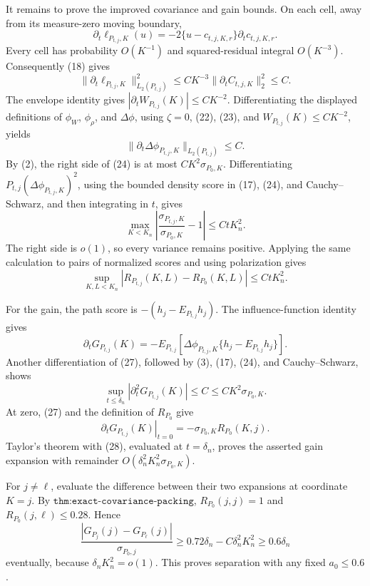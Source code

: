 It remains to prove the improved covariance and gain bounds.  On each cell, away from its measure-zero moving boundary,
\[
 \partial_t\ell_{P_{t,j},K}(u)=-2\{u-c_{t,j,K,r}\}\partial_tc_{t,j,K,r}.
\]
Every cell has probability \(O(K^{-1})\) and squared-residual integral \(O(K^{-3})\).  Consequently (18) gives
\[
 \|\partial_t\ell_{P_{t,j},K}\|_{L_2(P_{t,j})}^2
 \leq CK^{-3}\|\partial_tC_{t,j,K}\|_2^2\leq C.                                      \tag{23}
\]
The envelope identity gives \(|\partial_tW_{P_{t,j}}(K)|\leq CK^{-2}\).  Differentiating the displayed definitions of \(\phi_W\), \(\phi_\rho\), and \(\Delta\phi\), using \(\zeta=0\), (22), (23), and \(W_{P_{t,j}}(K)\leq CK^{-2}\), yields
\[
 \|\partial_t\Delta\phi_{P_{t,j},K}\|_{L_2(P_{t,j})}\leq C.                          \tag{24}
\]
By (2), the right side of (24) is at most \(CK^2\sigma_{P_0,K}\).  Differentiating \(P_{t,j}(\Delta\phi_{P_{t,j},K})^2\), using the bounded density score in (17), (24), and Cauchy--Schwarz, and then integrating in \(t\), gives
\[
 \max_{K<K_n}\left|\frac{\sigma_{P_{t,j},K}}{\sigma_{P_0,K}}-1\right|
 \leq CtK_n^2.                                                                          \tag{25}
\]
The right side is \(o(1)\), so every variance remains positive.  Applying the same calculation to pairs of normalized scores and using polarization gives
\[
 \sup_{K,L<K_n}|R_{P_{t,j}}(K,L)-R_{P_0}(K,L)|\leq CtK_n^2.                              \tag{26}
\]

For the gain, the path score is \(-(h_j-E_{P_{t,j}}h_j)\).  The influence-function identity gives
\[
 \partial_tG_{P_{t,j}}(K)
 =-E_{P_{t,j}}\!\left[\Delta\phi_{P_{t,j},K}
 \{h_j-E_{P_{t,j}}h_j\}\right].                                                        \tag{27}
\]
Another differentiation of (27), followed by (3), (17), (24), and Cauchy--Schwarz, shows
\[
 \sup_{t\leq\delta_n}|\partial_t^2G_{P_{t,j}}(K)|
 \leq C\leq CK^2\sigma_{P_0,K}.                                                        \tag{28}
\]
At zero, (27) and the definition of \(R_{P_0}\) give
\[
 \left.\partial_tG_{P_{t,j}}(K)\right|_{t=0}
 =-\sigma_{P_0,K}R_{P_0}(K,j).                                                          \tag{29}
\]
Taylor's theorem with (28), evaluated at \(t=\delta_n\), proves the asserted gain expansion with remainder \(O(\delta_n^2K_n^2\sigma_{P_0,K})\).

For \(j\ne\ell\), evaluate the difference between their two expansions at coordinate \(K=j\).  By \(\texttt{thm:exact-covariance-packing}\), \(R_{P_0}(j,j)=1\) and \(R_{P_0}(j,\ell)\leq0.28\).  Hence
\[
 \frac{|G_{P_j}(j)-G_{P_\ell}(j)|}{\sigma_{P_0,j}}
 \geq0.72\delta_n-C\delta_n^2K_n^2\geq0.6\delta_n                                    \tag{30}
\]
eventually, because \(\delta_nK_n^2=o(1)\).  This proves separation with any fixed \(a_0\leq0.6\).

